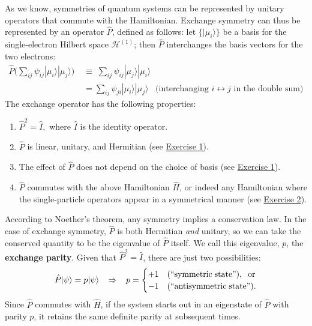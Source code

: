 \documentclass[pra,12pt]{revtex4}
\begin{document}
As we know, symmetries of quantum systems can be represented by
unitary operators that commute with the Hamiltonian.  Exchange
symmetry can thus be represented by an operator $\hat{P}$, defined as
follows: let $\{|\mu_i\rangle\}$ be a basis for the single-electron
Hilbert space $\mathscr{H}^{(1)}$; then $\hat{P}$ interchanges the
basis vectors for the two electrons:
$$\begin{aligned}\hat{P} \Big (\sum_{ij} \psi_{ij} |\mu_i\rangle|\mu_j\rangle \Big)
\;&\equiv\;  \sum_{ij} \psi_{ij} |\mu_j\rangle|\mu_i\rangle \\&= \sum_{ij} \psi_{ji} |\mu_i\rangle|\mu_j\rangle \;\;\;\textrm{(interchanging $i\leftrightarrow j$ in the double sum)}\end{aligned}$$
The exchange operator has the following properties:
\begin{enumerate}
\item $\hat{P}^2 = \hat{I},$ where $\hat{I}$ is the identity operator.

\item $\hat{P}$ is linear, unitary, and Hermitian (see
  \hyperref[ex:1]{Exercise 1}).
  
\item The effect of $\hat{P}$ does not depend on the choice
  of basis (see \hyperref[ex:1]{Exercise 1}).

\item $\hat{P}$ commutes with the above Hamiltonian $\hat{H}$, or
  indeed any Hamiltonian where the single-particle operators appear in
  a symmetrical manner (see \hyperref[ex:2]{Exercise 2}).
\end{enumerate}

According to Noether's theorem, any symmetry implies a conservation
law.  In the case of exchange symmetry, $\hat{P}$ is both Hermitian
\textit{and} unitary, so we can take the conserved quantity to be the
eigenvalue of $\hat{P}$ itself.  We call this eigenvalue, $p$, the
\textbf{exchange parity}.  Given that $\hat{P}^2 = \hat{I}$, there are
just two possibilities:
$$\hat{P} |\psi\rangle = p|\psi\rangle \;\;\;\Rightarrow\;\;\; p = \begin{cases}+1 & \textrm{(``symmetric\;state'')}, \;\;\textrm{or} \\ -1 & \textrm{(``antisymmetric\;state'').}\end{cases}$$
Since $\hat{P}$ commutes with $\hat{H}$, if the system starts out in
an eigenstate of $\hat{P}$ with parity $p$, it retains the same
definite parity at subsequent times.
\end{document}
